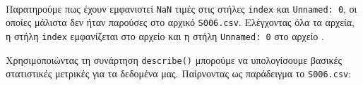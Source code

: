         \begin{table}[ht] \noindent\centering\tt
        \end{table}

        Παρατηρούμε πως έχουν εμφανιστεί \texttt{NaN} τιμές στις στήλες \texttt{index} και \texttt{Unnamed: 0}, οι οποίες μάλιστα δεν ήταν παρούσες στο αρχικό \texttt{S006.csv}.
        Ελέγχοντας όλα τα αρχεία, η στήλη \texttt{index} εμφανίζεται στο αρχείο \texttt{} και η στήλη \texttt{Unnamed: 0} στο αρχείο \texttt{}.

        Χρησιμοποιώντας τη συνάρτηση \texttt{describe()} μπορούμε να υπολογίσουμε βασικές στατιστικές μετρικές για τα δεδομένα μας.
        Παίρνοντας ως παράδειγμα το \texttt{S006.csv}:

